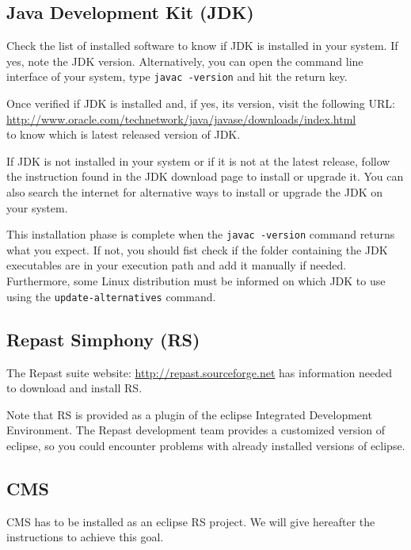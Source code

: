 \documentclass{article}
\begin{document}
\subsection{Java Development Kit (JDK)}

Check the list of installed software to know if JDK is installed in your system. If yes, note the JDK version.
Alternatively, you can open the command line interface of your system, type \verb+javac -version+ and hit the return key. 

Once verified if JDK is installed and, if yes, its version, visit the following URL:\\
\url{http://www.oracle.com/technetwork/java/javase/downloads/index.html}\\
to know which is latest released version of JDK.

If JDK is not installed in your system or if it is not at the latest release, follow the instruction found in the JDK download page to install or upgrade it. You can also search the internet for alternative ways to install or upgrade the JDK on your system.

This installation phase is complete when the \verb+javac -version+ command returns what you expect.
If not, you should fist check if the folder containing the JDK executables are in your execution path and add it manually if needed.
Furthermore, some Linux distribution must be informed on which JDK to use using the \verb+update-alternatives+ command. 

\subsection{Repast Simphony (RS)}

The Repast suite website: \url{http://repast.sourceforge.net} has information needed to download and install RS.

Note that RS is provided as a plugin of the eclipse Integrated Development Environment. The Repast development team provides a customized version of eclipse, so you could encounter problems with already installed versions of eclipse. 

\subsection{CMS}

CMS has to be installed as an eclipse RS project. We will give hereafter the instructions to achieve this goal.
\end{document}
